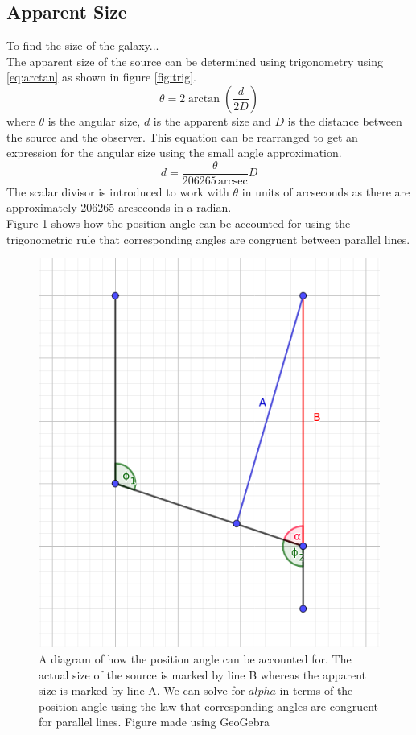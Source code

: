 \documentclass[%
reprint,
amsmath,amssymb,
aps,
]{revtex4-2}
\begin{document}
		\subsection{Apparent Size}
			To find the size of the galaxy...\\
			
			
			The apparent size of the source can be determined using trigonometry using \ref{eq:arctan} as shown in figure \ref{fig:trig}.
			\begin{equation}
				\theta = 2 \arctan{\left(\frac{d}{2 D}\right)}
				\label{eq:arctan}
			\end{equation}where $\theta$ is the angular size, $d$ is the apparent size and $D$ is the distance between the source and the observer. This equation can be rearranged to get an expression for the angular size using the small angle approximation.
			\begin{equation}
				d = \frac{\theta}{206265\,\text{arcsec}} D
				\label{eq:angSize}
			\end{equation}The scalar divisor is introduced to work with $\theta$ in units of arcseconds as there are approximately 206265 arcseconds in a radian\cite{modernAstro}.\\
		
			Figure \ref{fig:positionAngle} shows how the position angle can be accounted for using the trigonometric rule that corresponding angles are congruent between parallel lines.
		
			\begin{figure}
				\includegraphics[width=0.75\columnwidth]{positionAngle.png}
				\caption{\label{fig:positionAngle} A diagram of how the position angle can be accounted for. The actual size of the source is marked by line B whereas the apparent size is marked by line A. We can solve for $alpha$ in terms of the position angle using the law that corresponding angles are congruent for parallel lines. Figure made using GeoGebra}
			\end{figure}
		
\end{document}
